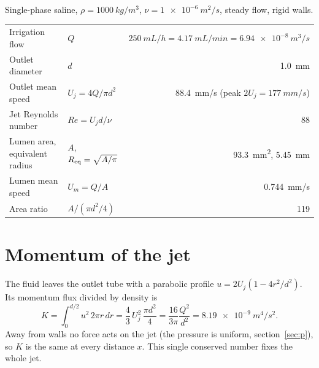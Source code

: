\documentclass[10pt,a4paper]{article}
\begin{document}
Single-phase saline, $\rho=\SI{1000}{kg/m^3}$, $\nu=\SI{1e-6}{m^2/s}$, steady flow, rigid walls.
\begin{center}\begin{tabular}{llr}\toprule
Irrigation flow & $Q$ & $\SI{250}{mL/h}=\SI{4.17}{mL/min}=\SI{6.94e-8}{m^3/s}$\\
Outlet diameter & $d$ & \SI{1.0}{mm}\\
Outlet mean speed & $U_j=4Q/\pi d^2$ & \SI{88.4}{mm/s} (peak $2U_j=\SI{177}{mm/s}$)\\
Jet Reynolds number & $Re=U_jd/\nu$ & 88\\
Lumen area, equivalent radius & $A$, $R_{\rm eq}=\sqrt{A/\pi}$ & \SI{93.3}{mm^2}, \SI{5.45}{mm}\\
Lumen mean speed & $U_m=Q/A$ & \SI{0.744}{mm/s}\\
Area ratio & $A/(\pi d^2/4)$ & 119\\ \bottomrule
\end{tabular}\end{center}

\section{Momentum of the jet}
The fluid leaves the outlet tube with a parabolic profile $u=2U_j(1-4r^2/d^2)$. Its momentum flux divided
by density is
\begin{equation}
K=\int_0^{d/2}u^2\,2\pi r\,dr=\frac43\,U_j^2\,\frac{\pi d^2}{4}=\frac{16}{3\pi}\frac{Q^2}{d^2}
 =\SI{8.19e-9}{m^4/s^2}.
\end{equation}
Away from walls no force acts on the jet (the pressure is uniform, section~\ref{sec:p}), so $K$ is the same
at every distance $x$. This single conserved number fixes the whole jet.
\end{document}
